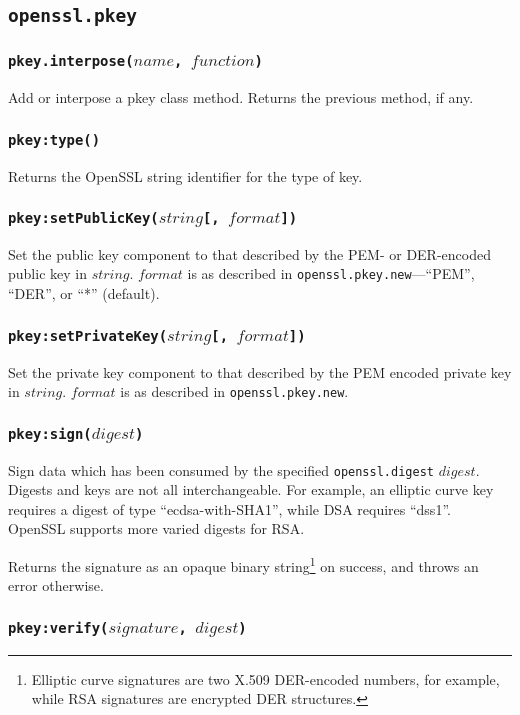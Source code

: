 \documentclass[11pt, oneside]{memoir}
\newcommand*{\fn}[1]{\texttt{#1}\xspace}
\newcommand*{\module}[1]{\texttt{#1}\xspace}
\newcounter{toccols}
\newenvironment{Module}[1]{
	\subsection{\texttt{#1}}
	\addtocontents{toc}{
		\protect\begin{multicols}{\value{toccols}}
	}
}{
	\addtocontents{toc}{\protect\end{multicols}}
}
\begin{document}
\begin{Module}{openssl.pkey}
\subsubsection[\fn{pkey.interpose}]{\fn{pkey.interpose($name$, $function$)}}

Add or interpose a pkey class method. Returns the previous method, if any.

\subsubsection[\fn{pkey:type}]{\fn{pkey:type()}}

Returns the OpenSSL string identifier for the type of key.

\subsubsection[\fn{pkey:setPublicKey}]{\fn{pkey:setPublicKey($string$[, $format$])}}

Set the public key component to that described by the PEM- or DER-encoded public key in $string$. $format$ is as described in \fn{openssl.pkey.new}---``PEM'', ``DER'', or ``*'' (default).

\subsubsection[\fn{pkey:setPrivateKey}]{\fn{pkey:setPrivateKey($string$[, $format$])}}

Set the private key component to that described by the PEM encoded private key in $string$. $format$ is as described in \fn{openssl.pkey.new}.

\subsubsection[\fn{pkey:sign}]{\fn{pkey:sign($digest$)}}

Sign data which has been consumed by the specified \module{openssl.digest} $digest$. Digests and keys are not all interchangeable. For example, an elliptic curve key requires a digest of type ``ecdsa-with-SHA1'', while DSA requires ``dss1''. OpenSSL supports more varied digests for RSA.

Returns the signature as an opaque binary string\footnote{Elliptic curve signatures are two X.509 DER-encoded numbers, for example, while RSA signatures are encrypted DER structures.} on success, and throws an error otherwise.

\subsubsection[\fn{pkey:verify}]{\fn{pkey:verify($signature$, $digest$)}}


\end{Module}
\end{document}
